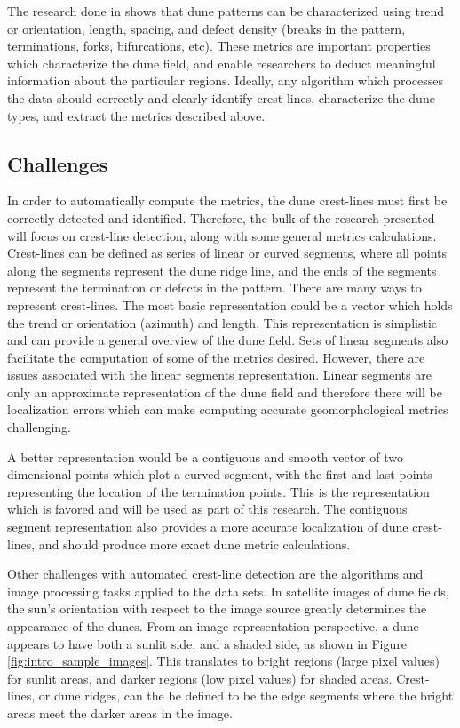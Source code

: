 The research done in \cite{ewing-kocurek-lake-2006,ewing-peyret-kocurek-bourke-2010} shows that dune patterns can be characterized using trend or orientation, length, spacing, and defect density (breaks in the pattern, terminations, forks, bifurcations, etc). These metrics are important properties which characterize the dune field, and enable researchers to deduct meaningful information about the particular regions. Ideally, any algorithm which processes the data should correctly and clearly identify crest-lines, characterize the dune types, and extract the metrics described above.


\subsection{Challenges}

In order to automatically compute the metrics, the dune crest-lines must first be correctly detected and identified. Therefore, the bulk of the research presented will focus on crest-line detection, along with some general metrics calculations. Crest-lines can be defined as series of linear or curved segments, where all points along the segments represent the dune ridge line, and the ends of the segments represent the termination or defects in the pattern. There are many ways to represent crest-lines. The most basic representation could be a vector which holds the trend or orientation (azimuth) and length. This representation is simplistic and can provide a general overview of the dune field. Sets of linear segments also facilitate the computation of some of the metrics desired. However, there are issues associated with the linear segments representation. Linear segments are only an approximate representation of the dune field and therefore there will be localization errors which can make computing accurate geomorphological metrics challenging.

A better representation would be a contiguous and smooth vector of two dimensional points which plot a curved segment, with the first and last points representing the location of the termination points. This is the representation which is favored and will be used as part of this research. The contiguous segment representation also provides a more accurate localization of dune crest-lines, and should produce more exact dune metric calculations.

Other challenges with automated crest-line detection are the algorithms and image processing tasks applied to the data sets. In satellite images of dune fields, the sun's orientation with respect to the image source greatly determines the appearance of the dunes. From an image representation perspective, a dune appears to have both a sunlit side, and a shaded side, as shown in Figure \ref{fig:intro_sample_images}. This translates to bright regions (large pixel values) for sunlit areas, and darker regions (low pixel values) for shaded areas. Crest-lines, or dune ridges, can the be defined to be the edge segments where the bright areas meet the darker areas in the image.

